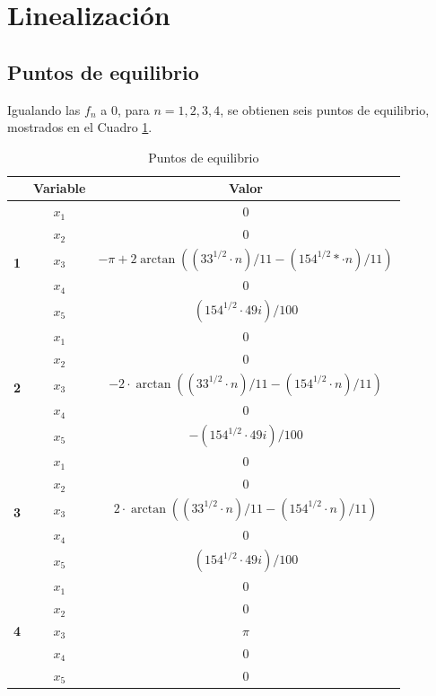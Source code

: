 \documentclass{ieeeaccess}
\begin{document}
\section{Linealización}

\subsection{Puntos de equilibrio}
Igualando las $f_n$ a 0, para $n=1,2,3,4$, se obtienen seis puntos de equilibrio, mostrados en el Cuadro \ref{tab: ptoseq}.

\begin{table}[h!]
\centering
\caption{Puntos de equilibrio}
\label{tab: ptoseq}
\begin{tabular}{|c|c|c|}
\hline
\textbf{} & \textbf{Variable} & \textbf{Valor}\\\hline
\multirow{5}{*}{\textbf{1}} & $x_1$ & 0\\
							& $x_2$ & 0\\
                            & $x_3$ & $- \pi + 2\arctan((33^{1/2}\cdot n)/11 - (154^{1/2}*\cdot n)/11)$\\
                            & $x_4$ & 0\\
                            & $x_5$ & $(154^{1/2}\cdot 49i)/100$\\\hline

\multirow{5}{*}{\textbf{2}} & $x_1$ & 0\\
							& $x_2$ & 0\\
                            & $x_3$ & $-2\cdot\arctan((33^{1/2}\cdot n)/11 - (154^{1/2}\cdot n)/11)$\\
                            & $x_4$ & 0\\
                            & $x_5$ & $-(154^{1/2}\cdot 49i)/100$\\\hline

\multirow{5}{*}{\textbf{3}} & $x_1$ & 0\\
							& $x_2$ & 0\\
                            & $x_3$ & $2\cdot\arctan((33^{1/2}\cdot n)/11 - (154^{1/2}\cdot n)/11)$\\
                            & $x_4$ & 0\\
                            & $x_5$ & $(154^{1/2}\cdot 49i)/100$\\\hline

\multirow{5}{*}{\textbf{4}} & $x_1$ & 0\\
							& $x_2$ & 0\\
                            & $x_3$ & $\pi$\\
                            & $x_4$ & 0\\
                            & $x_5$ & 0\\\hline
                            

\end{tabular}
\end{table}
\end{document}
